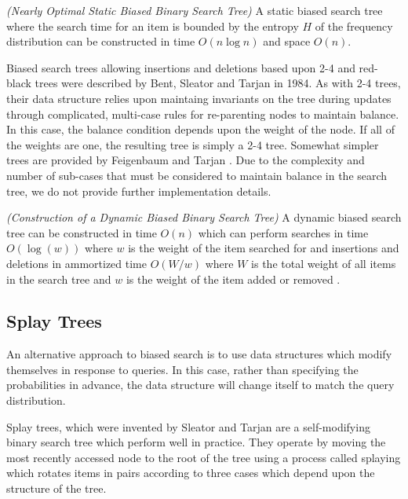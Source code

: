\documentclass[mcs]{scsthesis}
\begin{document}
\begin{thm} \emph{(Nearly Optimal Static Biased Binary Search Tree)} 
A static biased search tree where the search time for an item is bounded by
the entropy \(H\) of the frequency distribution can be constructed in time
\(O(n \log n)\) and space \(O(n)\).
\end{thm}

Biased search trees allowing insertions and deletions based upon 2-4 and
red-black trees were described by Bent, Sleator and Tarjan \cite{bst} in 1984.
As with 2-4 trees, their data structure relies upon maintaing invariants
on the tree during updates through complicated, multi-case rules for
re-parenting nodes to maintain balance. In this case, the balance condition
depends upon the weight of the node. If all of the weights are one, the
resulting tree is simply a 2-4 tree. Somewhat simpler trees are provided
by Feigenbaum and Tarjan \cite{bst2}. Due to the complexity and number of
sub-cases that must be considered to maintain balance in the search tree, we do
not provide further implementation details.

\begin{thm} \emph{(Construction of a Dynamic Biased Binary Search Tree)} 
A dynamic biased search tree can be constructed in time \(O(n)\) which can
perform searches in time \(O(\log(w))\) where \(w\) is the weight of the item
searched for and insertions and deletions in ammortized time \(O(W / w)\)
where \(W\) is the total weight of all items in the search tree and \(w\) is
the weight of the item added or removed \cite{bst2}.
\end{thm}

\subsection{Splay Trees}

An alternative approach to biased search is to use data structures which
modify themselves in response to queries. In this case, rather than specifying
the probabilities in advance, the data structure will change itself to match
the query distribution. 

Splay trees, which were invented by Sleator and Tarjan \cite{splaytree} are a
self-modifying binary search tree which perform well in practice. They operate
by moving the most recently accessed node to the root of the tree using a
process called splaying which rotates items in pairs according to three cases
which depend upon the structure of the tree.
\end{document}
